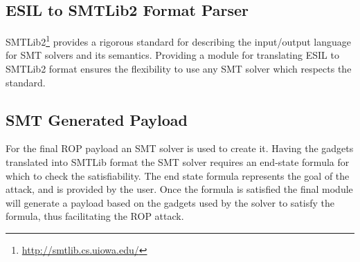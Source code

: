 \subsection{ESIL to SMTLib2 Format Parser}

SMTLib2\footnote{\url{http://smtlib.cs.uiowa.edu/}} provides a rigorous standard for describing the input/output language for SMT solvers and its semantics. Providing a module for translating ESIL to SMTLib2 format ensures the flexibility to use any SMT solver which respects the standard.

\subsection{SMT Generated Payload}

For the final ROP payload an SMT solver is used to create it. Having the gadgets translated into SMTLib format the SMT solver requires an end-state formula for which to check the satisfiability. The end state formula represents the goal of the attack, and is provided by the user. Once the formula is satisfied the final module will generate a payload based on the gadgets used by the solver to satisfy the formula, thus facilitating the ROP attack.
